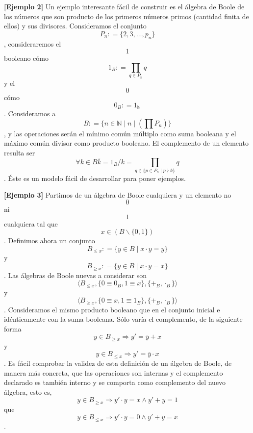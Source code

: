 \begin{enumerate}
  \textbf{{[}Ejemplo 2{]}} Un ejemplo interesante fácil de construir es
  el álgebra de Boole de los números que son producto de los primeros
  núme\-ros primos (cantidad finita de ellos) y sus divisores.
  Consideramos el conjunto \[P_{n}{: = {\{{2,3,\ldots,p_{n}}\}}}\],
  con\-sideraremos el \[1\] booleano cómo
  \[1_{B}{: = {\prod\limits_{q \in P_{n}}q}}\]y el \[0\]
  cómo\[0_{B}{: = 1_{\mathbb{N}}}\]. Consideramos a
  \[B{: = {\{{{n \in \mathbb{N}} \mid {n \mid \left( {\prod P_{n}} \right)}}\}}}\],
  y las operaciones serán el mínimo común múltiplo como suma booleana y
  el máximo común divisor como producto booleano. El complemento de un
  ele\-mento resulta ser
  \[\forall{k \in B}{{\overline{k} = {1_{B}/k}} = {\prod\limits_{q \in {\{{{{p \in P_{n}} \mid p} \nmid k}\}}}q}}\].
  Éste es un modelo fácil de desarrollar para poner ejemplos.

  \textbf{{[}Ejemplo 3{]} }Partimos de un álgebra de Boole cualquiera y
  un elemento no \[0\] ni \[1\] cualquie\-ra tal
  que\[x \in \left( {B \smallsetminus {\{ 0,1\}}} \right)\]. Definimos
  ahora un
  conjunto\[B_{\leq x}{: = {\{{{{y \in B} \mid {x \cdot y}} = y}\}}}\]y\[B_{\geq x}{: = {\{{{{y \in B} \mid {x \cdot y}} = x}\}}}\].
  Las álgebras de Boole nuevas a considerar son
  \[\langle{B_{\leq x},{\{{{0 \equiv 0_{B}},{1 \equiv x}}\}},{\{{+_{B}, \cdot_{B}}\}}}\rangle\]
  y
  \[\langle{B_{\geq x},{\{{{0 \equiv x},{1 \equiv 1_{B}}}\}},{\{{+_{B}, \cdot_{B}}\}}}\rangle\].
  Consideramos el mismo producto booleano que en el conjunto inicial e
  idéntica\-mente con la suma booleana. Sólo varía el complemento, de la
  siguiente
  forma\[{y \in B_{\geq x}}\Rightarrow y{' = {\overline{y} + x}}\]y\[{y \in B_{\leq x}}\Rightarrow y{' = {\overline{y} \cdot x}}\].
  Es fácil comprobar la validez de esta definición de un álgebra de
  Boole, de manera más concreta, que las operaciones son internas y el
  complemento declarado es también interno y se comporta como
  complemento del nuevo álgebra, esto
  es,\[{y \in B_{\geq x}}\Rightarrow y{{' \cdot y} = {x \land y}}{{' + y} = 1}\]
  que\[{y \in B_{\leq x}}\Rightarrow y{{' \cdot y} = {0 \land y}}{{' + y} = x}\].


\end{enumerate}
